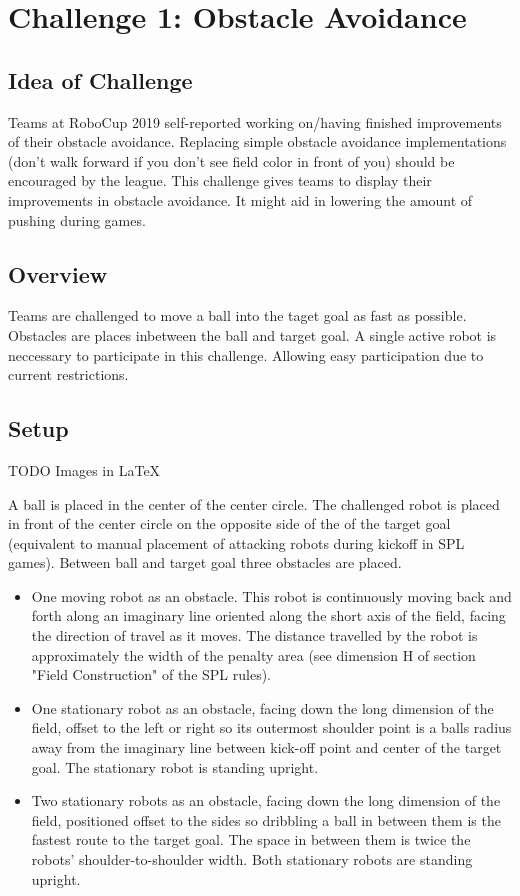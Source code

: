 \section{Challenge 1: Obstacle Avoidance}

\subsection{Idea of Challenge}

Teams at RoboCup 2019 self-reported working on/having finished improvements of their obstacle avoidance. Replacing simple obstacle avoidance implementations (don't walk forward if you don't see field color in front of you) should be encouraged by the league. This challenge gives teams to display their improvements in obstacle avoidance. It might aid in lowering the amount of pushing during games.

\subsection{Overview}

Teams are challenged to move a ball into the taget goal as fast as possible. Obstacles are places inbetween the ball and target goal. A single active robot is neccessary to participate in this challenge. Allowing easy participation due to current restrictions.

\subsection{Setup}

TODO Images in \LaTeX

A ball is placed in the center of the center circle. The challenged robot is placed in front of the center circle on the opposite side of the of the target goal (equivalent to manual placement of attacking robots during kickoff in SPL games). Between ball and target goal three obstacles are placed.

\begin{itemize}
  \item One moving robot as an obstacle. This robot is continuously moving back and forth along an imaginary line oriented along the short axis of the field, facing the direction of travel as it moves. The distance travelled by the robot is approximately the width of the penalty area (see dimension H of section "Field Construction" of the SPL rules).
  \item One stationary robot as an obstacle, facing down the long dimension of the field, offset to the left or right so its outermost shoulder point is a balls radius away from the imaginary line between kick-off point and center of the target goal. The stationary robot is standing upright.
  \item Two stationary robots as an obstacle, facing down the long dimension of the field, positioned offset to the sides so dribbling a ball in between them is the fastest route to the target goal. The space in between them is twice the robots' shoulder-to-shoulder width.  Both stationary robots are standing upright.
\end{itemize}

